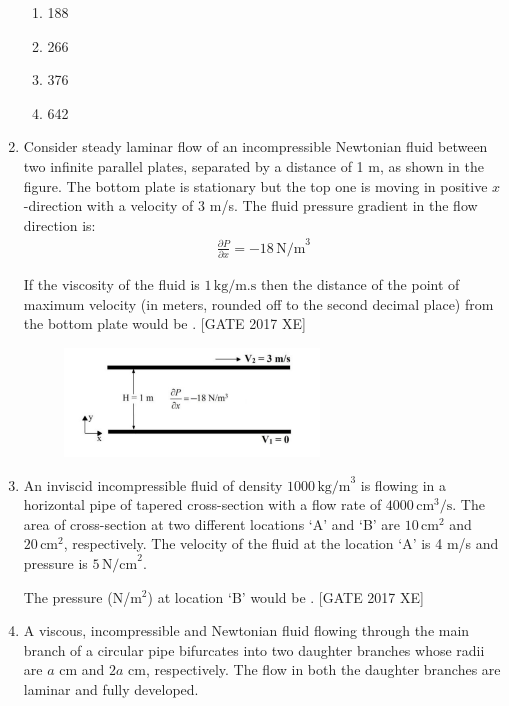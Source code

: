 \documentclass[journal,12pt,onecolumn]{IEEEtran}
\theoremstyle{remark}
\begin{document}
\begin{enumerate}
\begin{multicols}{2}
\begin{enumerate}
    \item 188
    \item 266
    \item 376
    \item 642
\end{enumerate}
\end{multicols}

\item Consider steady laminar flow of an incompressible Newtonian fluid between two infinite parallel plates, separated by a distance of 1 m, as shown in the figure.  
The bottom plate is stationary but the top one is moving in positive $x$-direction with a velocity of 3 m/s.  
The fluid pressure gradient in the flow direction is:  
\begin{align}
\frac{\partial P}{\partial x} = -18 \,\text{N/m}^3
\end{align}

If the viscosity of the fluid is $1 \,\text{kg/m.s}$ then the distance of the point of maximum velocity (in meters, rounded off to the second decimal place) from the bottom plate would be \underline{\hspace{2cm}}.  
\hfill [GATE 2017 XE]

\begin{figure}[H]
    \centering
    \includegraphics[width=0.5\linewidth]{figs/fig7.png}
    \caption{}
    \label{fig:fig7}
\end{figure}
\item An inviscid incompressible fluid of density $1000 \,\text{kg/m}^3$ is flowing in a horizontal pipe of tapered cross-section with a flow rate of $4000 \,\text{cm}^3/\text{s}$.  
The area of cross-section at two different locations ‘A’ and ‘B’ are $10 \,\text{cm}^2$ and $20 \,\text{cm}^2$, respectively.  
The velocity of the fluid at the location ‘A’ is 4 m/s and pressure is $5 \,\text{N/cm}^2$.  

The pressure (N/m$^2$) at location ‘B’ would be \underline{\hspace{2cm}}.  
\hfill [GATE 2017 XE]

\item A viscous, incompressible and Newtonian fluid flowing through the main branch of a circular pipe bifurcates into two daughter branches whose radii are $a$ cm and $2a$ cm, respectively.  
The flow in both the daughter branches are laminar and fully developed.  


\end{enumerate}
\end{document}
